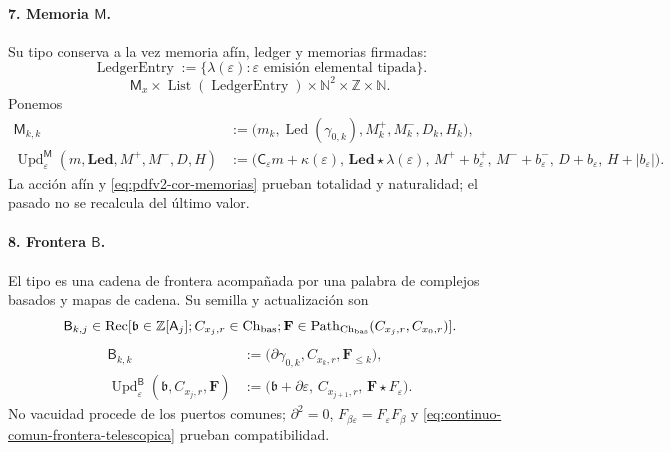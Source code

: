 \paragraph{7. Memoria \(\mathsf M\).}
Su tipo conserva a la vez memoria afín, ledger y memorias firmadas:
\begin{equation}
\label{eq:pdfv2-terminal-tipo-ledger-entry}
 \operatorname{LedgerEntry}:=
 \{\lambda(\varepsilon):\varepsilon\text{ emisión elemental tipada}\}.
\end{equation}
\[
 \mathsf M_x\times\operatorname{List}(\operatorname{LedgerEntry})
 \times\mathbb N^2\times\mathbb Z\times\mathbb N.
\]
Ponemos
\begin{align}
 \mathsf M_{k,k}&:=
 \bigl(m_k,\operatorname{Led}(\gamma_{0,k}),
       M_k^+,M_k^-,D_k,H_k\bigr),
 \label{eq:pdfv2-terminal-semilla-m}\\
 \operatorname{Upd}^{\mathsf M}_{\varepsilon}
 (m,\mathbf{Led},M^+,M^-,D,H)
 &:=
 \bigl(\mathsf C_\varepsilon m+\kappa(\varepsilon),\,
 \mathbf{Led}\star\lambda(\varepsilon),\,
 M^++b_\varepsilon^+,\,M^-+b_\varepsilon^-,\,
 D+b_\varepsilon,\,H+|b_\varepsilon|\bigr).
 \label{eq:pdfv2-terminal-update-m}
\end{align}
La acción afín y \eqref{eq:pdfv2-cor-memorias} prueban totalidad y
naturalidad; el pasado no se recalcula del último valor.

\paragraph{8. Frontera \(\mathsf B\).}
El tipo es una cadena de frontera acompañada por una palabra de complejos
basados y mapas de cadena. Su semilla y actualización son
\[
 \mathsf B_{k,j}\in
 \operatorname{Rec}[\mathfrak b\in\mathbb Z[\mathsf A_j];
 C_{x_j,r}\in\operatorname{Ch}_{\rm bas};
 \mathbf F\in\operatorname{Path}_{\operatorname{Ch}_{\rm bas}}
 (C_{x_j,r},C_{x_0,r})].
\]
\begin{align}
 \mathsf B_{k,k}&:=
 \bigl(\partial\gamma_{0,k},C_{x_k,r},\mathbf F_{\leq k}\bigr),
 \label{eq:pdfv2-terminal-semilla-b}\\
 \operatorname{Upd}^{\mathsf B}_{\varepsilon}
 (\mathfrak b,C_{x_j,r},\mathbf F)
 &:=
 \bigl(\mathfrak b+\partial\varepsilon,\,
 C_{x_{j+1},r},\,\mathbf F\star F_\varepsilon\bigr).
 \label{eq:pdfv2-terminal-update-b}
\end{align}
No vacuidad procede de los puertos comunes; \(\partial^2=0\),
\(F_{\beta\varepsilon}=F_\varepsilon F_\beta\) y
\eqref{eq:continuo-comun-frontera-telescopica} prueban compatibilidad.

